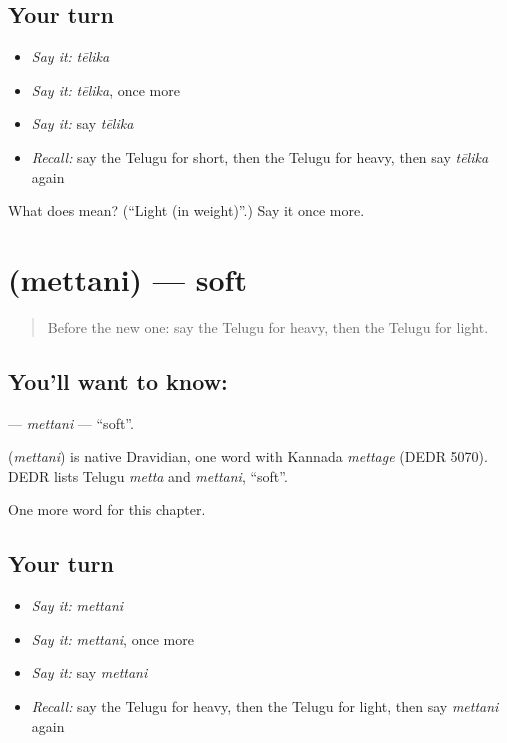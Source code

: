 \subsection*{Your turn}
\begin{itemize}
\raggedright
  \item \emph{Say it:} \emph{tēlika}
  \item \emph{Say it:} \emph{tēlika}, once more
  \item \emph{Say it:} say \emph{tēlika}
  \item \emph{Recall:} say the Telugu for short, then the Telugu for heavy, then say \emph{tēlika} again
\end{itemize}

\begin{tcolorbox}[breakable,colback=teal!4,colframe=teal!35!black,title={Before you move on}]
What does  mean? (\textquotedblleft{}Light (in weight)\textquotedblright{}.) Say it once more.
\end{tcolorbox}
\section[\texorpdfstring{\te{మెత్తని} (mettani)}{మెత్తని (mettani)}]{ (mettani) — soft}

\label{lesson:TE-C137-mettani}



\begin{quote}
Before the new one: say the Telugu for heavy, then the Telugu for light.
\end{quote}

\subsection*{You'll want to know: }
\textbf{} — \emph{mettani} — \textquotedblleft{}soft\textquotedblright{}.

\begin{cousinweb}
\textbf{} (\emph{mettani}) is native Dravidian, one word with Kannada \emph{mettage} (DEDR 5070). DEDR lists Telugu \emph{metta} and \emph{mettani}, \textquotedblleft{}soft\textquotedblright{}.
\end{cousinweb}

\begin{grammarlens}[title={What you've built}]
One more word for this chapter.
\end{grammarlens}

\subsection*{Your turn}
\begin{itemize}
\raggedright
  \item \emph{Say it:} \emph{mettani}
  \item \emph{Say it:} \emph{mettani}, once more
  \item \emph{Say it:} say \emph{mettani}
  \item \emph{Recall:} say the Telugu for heavy, then the Telugu for light, then say \emph{mettani} again
\end{itemize}


